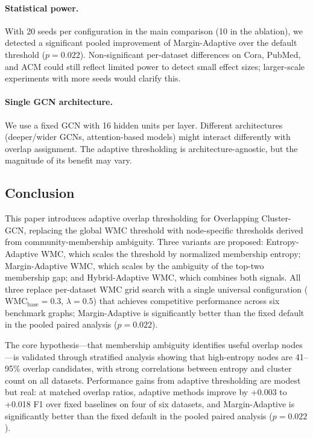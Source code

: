 \documentclass[pdflatex,sn-mathphys-num]{sn-jnl}%
\theoremstyle{thmstyleone}%
\theoremstyle{thmstyletwo}%
\theoremstyle{thmstylethree}%
\begin{document}
\paragraph{Statistical power.}
With 20 seeds per configuration in the main comparison (10 in the ablation), we detected a significant pooled improvement of Margin-Adaptive over the default threshold ($p=0.022$). 
Non-significant per-dataset differences on Cora, PubMed, and ACM could still reflect limited power to detect small effect sizes; larger-scale experiments with more seeds would clarify this.

\paragraph{Single GCN architecture.}
We use a fixed GCN with 16 hidden units per layer. 
Different architectures (deeper/wider GCNs, attention-based models) might interact differently with overlap assignment. 
The adaptive thresholding is architecture-agnostic, but the magnitude of its benefit may vary.

\subsection{Conclusion}
\label{sec:conclusion}

This paper introduces adaptive overlap thresholding for Overlapping Cluster-GCN, replacing the global WMC threshold with node-specific thresholds derived from community-membership ambiguity. 
Three variants are proposed: Entropy-Adaptive WMC, which scales the threshold by normalized membership entropy; Margin-Adaptive WMC, which scales by the ambiguity of the top-two membership gap; and Hybrid-Adaptive WMC, which combines both signals. 
All three replace per-dataset WMC grid search with a single universal configuration ($\mathrm{WMC}_{\mathrm{base}}=0.3$, $\lambda=0.5$) that achieves competitive performance across six benchmark graphs; Margin-Adaptive is significantly better than the fixed default in the pooled paired analysis ($p=0.022$).

The core hypothesis—that membership ambiguity identifies useful overlap nodes—is validated through stratified analysis showing that high-entropy nodes are 41--95\% overlap candidates, with strong correlations between entropy and cluster count on all datasets. 
Performance gains from adaptive thresholding are modest but real: at matched overlap ratios, adaptive methods improve by +0.003 to +0.018 F1 over fixed baselines on four of six datasets, and Margin-Adaptive is significantly better than the fixed default in the pooled paired analysis ($p=0.022$).
\end{document}
